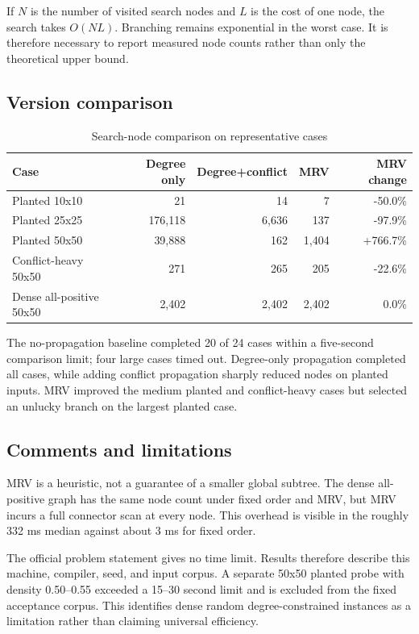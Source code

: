 \documentclass[11pt,a4paper]{article}
\begin{document}
If $N$ is the number of visited search nodes and $L$ is the cost of one node,
the search takes $O(NL)$. Branching remains exponential in the worst case.
It is therefore necessary to report measured node counts rather than only the
theoretical upper bound.

\subsection{Version comparison}

\begin{table}[H]
\centering
\caption{Search-node comparison on representative cases}
\small
\begin{tabular}{lrrrr}
\toprule
Case & Degree only & Degree+conflict & MRV & MRV change \\
\midrule
Planted 10x10 & 21 & 14 & 7 & -50.0\% \\
Planted 25x25 & 176,118 & 6,636 & 137 & -97.9\% \\
Planted 50x50 & 39,888 & 162 & 1,404 & +766.7\% \\
Conflict-heavy 50x50 & 271 & 265 & 205 & -22.6\% \\
Dense all-positive 50x50 & 2,402 & 2,402 & 2,402 & 0.0\% \\
\bottomrule
\end{tabular}
\end{table}

The no-propagation baseline completed 20 of 24 cases within a five-second
comparison limit; four large cases timed out. Degree-only propagation completed
all cases, while adding conflict propagation sharply reduced nodes on planted
inputs. MRV improved the medium planted and conflict-heavy cases but selected
an unlucky branch on the largest planted case.

\subsection{Comments and limitations}

MRV is a heuristic, not a guarantee of a smaller global subtree. The dense
all-positive graph has the same node count under fixed order and MRV, but MRV
incurs a full connector scan at every node. This overhead is visible in the
roughly 332 ms median against about 3 ms for fixed order.

The official problem statement gives no time limit. Results therefore describe
this machine, compiler, seed, and input corpus. A separate 50x50 planted probe
with density 0.50--0.55 exceeded a 15--30 second limit and is excluded from the
fixed acceptance corpus. This identifies dense random degree-constrained
instances as a limitation rather than claiming universal efficiency.
\end{document}
